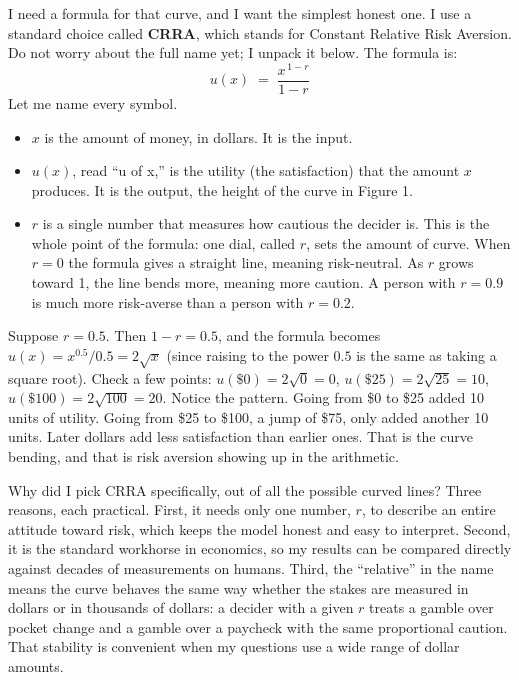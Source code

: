 \documentclass[11pt]{article}
\newcommand{\term}[1]{\textbf{\color{mossdk}#1}}
\begin{document}
I need a formula for that curve, and I want the simplest honest one. I use a standard choice called
\term{CRRA}, which stands for Constant Relative Risk Aversion. Do not worry about the full name yet; I
unpack it below. The formula is:
\[
u(x) \;=\; \frac{x^{\,1-r}}{1-r}
\]
Let me name every symbol.
\begin{itemize}
\item $x$ is the amount of money, in dollars. It is the input.
\item $u(x)$, read ``u of x,'' is the utility (the satisfaction) that the amount $x$ produces. It is
the output, the height of the curve in Figure 1.
\item $r$ is a single number that measures how cautious the decider is. This is the whole point of the
formula: one dial, called $r$, sets the amount of curve. When $r = 0$ the formula gives a straight
line, meaning risk-neutral. As $r$ grows toward 1, the line bends more, meaning more caution. A
person with $r = 0.9$ is much more risk-averse than a person with $r = 0.2$.
\end{itemize}

\begin{workbox}
Suppose $r = 0.5$. Then $1 - r = 0.5$, and the formula becomes $u(x) = x^{0.5} / 0.5 = 2\sqrt{x}$
(since raising to the power $0.5$ is the same as taking a square root). Check a few points:
$u(\$0) = 2\sqrt{0} = 0$, $u(\$25) = 2\sqrt{25} = 10$, $u(\$100) = 2\sqrt{100} = 20$. Notice the
pattern. Going from \$0 to \$25 added 10 units of utility. Going from \$25 to \$100, a jump of \$75,
only added another 10 units. Later dollars add less satisfaction than earlier ones. That is the curve
bending, and that is risk aversion showing up in the arithmetic.
\end{workbox}

Why did I pick CRRA specifically, out of all the possible curved lines? Three reasons, each practical.
First, it needs only one number, $r$, to describe an entire attitude toward risk, which keeps the
model honest and easy to interpret. Second, it is the standard workhorse in economics, so my results
can be compared directly against decades of measurements on humans. Third, the ``relative'' in the
name means the curve behaves the same way whether the stakes are measured in dollars or in thousands
of dollars: a decider with a given $r$ treats a gamble over pocket change and a gamble over a
paycheck with the same proportional caution. That stability is convenient when my questions use a wide
range of dollar amounts.
\end{document}
